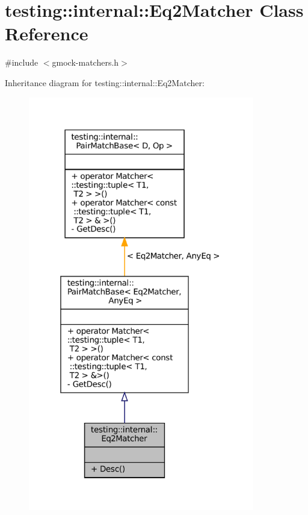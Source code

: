 \hypertarget{classtesting_1_1internal_1_1Eq2Matcher}{}\section{testing\+:\+:internal\+:\+:Eq2\+Matcher Class Reference}
\label{classtesting_1_1internal_1_1Eq2Matcher}


{\ttfamily \#include $<$gmock-\/matchers.\+h$>$}



Inheritance diagram for testing\+:\+:internal\+:\+:Eq2\+Matcher\+:
\nopagebreak
\begin{figure}[H]
\begin{center}
\leavevmode
\includegraphics[width=280pt]{classtesting_1_1internal_1_1Eq2Matcher__inherit__graph}
\end{center}
\end{figure}



